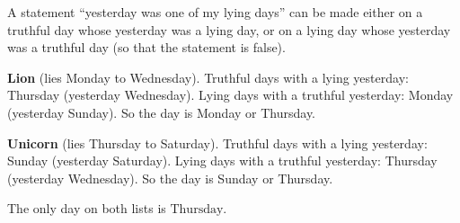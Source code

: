 A statement ``yesterday was one of my lying days'' can be made either on a truthful day whose yesterday was a lying day, or on a lying day whose yesterday was a truthful day (so that the statement is false).

\textbf{Lion} (lies Monday to Wednesday). Truthful days with a lying yesterday: Thursday (yesterday Wednesday). Lying days with a truthful yesterday: Monday (yesterday Sunday). So the day is Monday or Thursday.

\textbf{Unicorn} (lies Thursday to Saturday). Truthful days with a lying yesterday: Sunday (yesterday Saturday). Lying days with a truthful yesterday: Thursday (yesterday Wednesday). So the day is Sunday or Thursday.

The only day on both lists is $\boxed{\text{Thursday}}$.
